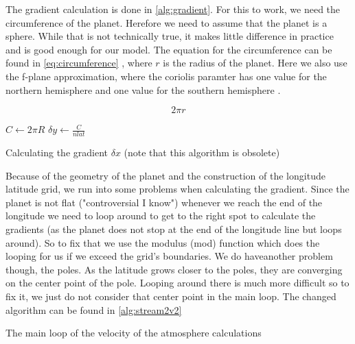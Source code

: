 The gradient calculation is done in \autoref{alg:gradient}. For this to work, we need the circumference of the planet. Herefore we need to assume that the planet is a sphere. While that is not 
technically true, it makes little difference in practice and is good enough for our model. The equation for the circumference can be found in \autoref{eq:circumference} \cite{circumference}, 
where $r$ is the radius of the planet. Here we also use the f-plane approximation, where the coriolis paramter has one value for the northern hemisphere and one value for the southern hemisphere 
\cite{fplane}.

\begin{equation}
    2 \pi r
    \label{eq:circumference}
\end{equation}

\begin{algorithm}
    \SetAlgoLined
    $C \leftarrow 2\pi R$ \;
    $\delta y \leftarrow \frac{C}{nlat}$ \;

    \caption{Calculating the gradient $\delta x$ (note that this algorithm is obsolete)}
    \label{alg:gradient}
\end{algorithm}

Because of the geometry of the planet and the construction of the longitude latitude grid, we run into some problems when calculating the gradient. Since the planet is not flat ("controversial 
I know"\cite{simon}) whenever we reach the end of the longitude we need to loop around to get to the right spot to calculate the gradients (as the planet does not stop at the end of the 
longitude line but loops around). So to fix that we use the modulus (mod) function which does the looping for us if we exceed the grid's boundaries. We do haveanother problem though, the poles. 
As the latitude grows closer to the poles, they are converging on the center point of the pole. Looping around there is much more difficult so to fix it, we just do not consider that center 
point in the main loop. The changed algorithm can be found in \autoref{alg:stream2v2}

\begin{algorithm}[hbt]
    \SetAlgoLined
    \caption{The main loop of the velocity of the atmosphere calculations}
    \label{alg:stream2v2}
\end{algorithm}

